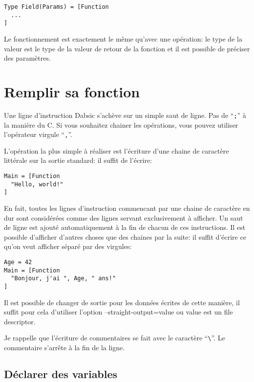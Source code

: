 \documentclass[a5paper, 12pt]{book}
\begin{document}
\begin{verbatim}
Type Field(Params) = [Function
  ...
]
\end{verbatim}

Le fonctionnement est exactement le même qu'avec une
opération: le type de la valeur est le type de la valeur
de retour de la fonction et il est possible de préciser
des paramètres.

\section{Remplir sa fonction}

Une ligne d'instruction Dabsic s'achève sur un simple saut de ligne.
Pas de ``\verb!;!'' à la manière du C. Si vous souhaitez chainer les opérations,
vous pouvez utiliser l'opérateur virgule ``\verb!,!''.

L'opération la plus simple à réaliser est l'écriture d'une chaine
de caractère littérale sur la sortie standard: il suffit de l'écrire:\\

\begin{verbatim}
Main = [Function
  "Hello, world!"
]
\end{verbatim}

En fait, toutes les lignes d'instruction commencant par une chaine
de caractère en dur sont considérées comme des lignes servant
exclusivement à afficher. Un saut de ligne est ajouté automatiquement
à la fin de chacun de ces instructions. Il est possible d'afficher
d'autres choses que des chaines par la suite: il suffit d'écrire
ce qu'on veut afficher séparé par des virgules:\\

\begin{verbatim}
Age = 42
Main = [Function
  "Bonjour, j'ai ", Age, " ans!"
]
\end{verbatim}

Il est possible de changer de sortie pour les données écrites de
cette manière, il suffit pour cela d'utiliser l'option --straight-output=value
ou value est un file descriptor.

Je rappelle que l'écriture de commentaires se fait avec le caractère ``\verb!\!''.
Le commentaire s'arrête à la fin de la ligne.

\subsection{Déclarer des variables}
\end{document}
